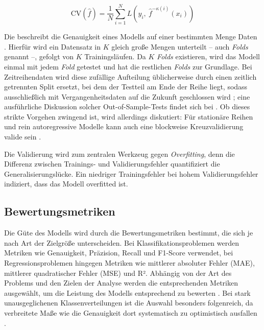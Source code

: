 \begin{equation}
  \text{CV}(\hat{f}) = \frac{1}{N}\sum_{i=1}^{N} L\left(y_i,\ \hat{f}^{-\kappa(i)}(x_i)\right)
  \label{eq:validify}  
\end{equation}

Die  beschreibt die Genauigkeit eines Modells auf einer bestimmten Menge Daten \parencite[Kap. 7.10]{hastie2009elements}. Hierfür wird ein Datensatz in $K$ gleich große Mengen unterteilt -- auch \textit{Folds} genannt --, gefolgt von $K$ Trainingsläufen. Da $K$ \textit{Folds} existieren, wird das Modell einmal mit jedem \textit{Fold} getestet und hat die restlichen \textit{Folds} zur Grundlage. Bei Zeitreihendaten wird diese zufällige Aufteilung üblicherweise durch einen zeitlich getrennten Split ersetzt, bei dem der Testteil am Ende der Reihe liegt, sodass ausschließlich mit Vergangenheitsdaten auf die Zukunft geschlossen wird \parencite[Kap. 5.8]{hyndman2021forecasting}; eine ausführliche Diskussion solcher Out-of-Sample-Tests findet sich bei \textcite{tashman2000outofsample}. Ob dieses strikte Vorgehen zwingend ist, wird allerdings diskutiert: Für stationäre Reihen und rein autoregressive Modelle kann auch eine blockweise Kreuzvalidierung valide sein \parencite{bergmeir2012cv}.

Die Validierung wird zum zentralen Werkzeug gegen \emph{Overfitting}, denn die Differenz zwischen Trainings- und Validierungsfehler quantifiziert die Generalisierungslücke. Ein niedriger Trainingsfehler bei hohem Validierungsfehler indiziert, dass das Modell overfitted ist.

\subsection{Bewertungsmetriken}

Die Güte des Modells wird durch die Bewertungsmetriken bestimmt, die sich je nach Art der Zielgröße unterscheiden. Bei Klassifikationsproblemen werden Metriken wie Genauigkeit, Präzision, Recall und F1-Score verwendet, bei Regressionsproblemen hingegen Metriken wie mittlerer absoluter Fehler (MAE), mittlerer quadratischer Fehler (MSE) und R². Abhängig von der Art des Problems und den Zielen der Analyse werden die entsprechenden Metriken ausgewählt, um die Leistung des Modells entsprechend zu bewerten \parencite{hastie2009elements}. Bei stark unausgeglichenen Klassenverteilungen ist die Auswahl besonders folgenreich, da verbreitete Maße wie die Genauigkeit dort systematisch zu optimistisch ausfallen \parencite{he2009imbalanced}.

